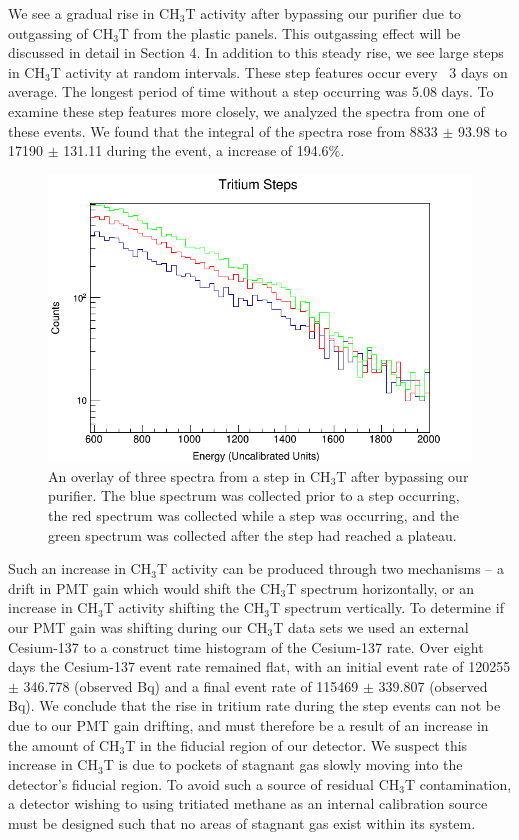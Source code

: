 We see a gradual rise in CH$_3$T activity after bypassing our purifier due to outgassing of CH$_3$T from the plastic panels.  This outgassing effect will be discussed in detail in Section 4. In addition to this steady rise, we see large steps in CH$_3$T activity at random intervals.  These step features occur every ~3 days on average.  The longest period of time without a step occurring was 5.08 days. To examine these step features more closely, we analyzed the spectra from one of these events.  We found that the integral of the spectra rose from 8833 $\pm$ 93.98 to 17190 $\pm$ 131.11 during the event, a increase of 194.6\%. 

\begin{figure}[h]
\centering
\includegraphics[scale=0.25]{Steps_Overlay.png}
\caption{An overlay of three spectra from a step in CH$_3$T after bypassing our purifier.  The blue spectrum was collected prior to a step occurring, the red spectrum was collected while a step was occurring, and the green spectrum was collected after the step had reached a plateau.}
\label{fig:Steps}
\end{figure}

Such an increase in CH$_3$T activity can be produced through two mechanisms -- a drift in PMT gain which would shift the CH$_3$T spectrum horizontally, or an increase in CH$_3$T activity shifting the CH$_3$T spectrum vertically.  To determine if our PMT gain was shifting during our CH$_3$T data sets we used an external Cesium-137 to a construct time histogram of the Cesium-137 rate.  Over eight days the Cesium-137 event rate remained flat, with an initial event rate of 120255 $\pm$ 346.778 (observed Bq) and a final event rate of 115469 $\pm$ 339.807 (observed Bq). We conclude that the rise in tritium rate during the step events can not be due to our PMT gain drifting, and must therefore be a result of an increase in the amount of CH$_3$T in the fiducial region of our detector.  We suspect this increase in CH$_3$T is due to pockets of stagnant gas slowly moving into the detector's fiducial region.  To avoid such a source of residual CH$_3$T contamination, a detector wishing to using tritiated methane as an internal calibration source must be designed such that no areas of stagnant gas exist within its system.

